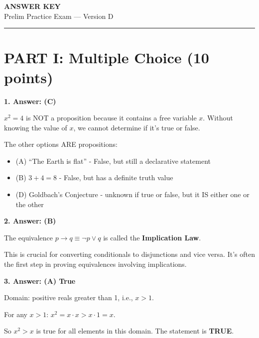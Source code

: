 \documentclass[11pt,a4paper]{article}
\begin{document}
\begin{center}
{\LARGE\textbf{ANSWER KEY}}\\[5pt]
{\Large Prelim Practice Exam --- Version D}\\[10pt]
\rule{0.8\textwidth}{0.5pt}
\end{center}

\vspace{15pt}

\section*{PART I: Multiple Choice (10 points)}

\textbf{1. Answer: (C)}

\begin{solnbox}
$x^2 = 4$ is NOT a proposition because it contains a free variable $x$. Without knowing the value of $x$, we cannot determine if it's true or false.

The other options ARE propositions:
\begin{itemize}[noitemsep]
    \item (A) ``The Earth is flat'' - False, but still a declarative statement
    \item (B) $3 + 4 = 8$ - False, but has a definite truth value
    \item (D) Goldbach's Conjecture - unknown if true or false, but it IS either one or the other
\end{itemize}
\end{solnbox}

\vspace{10pt}

\textbf{2. Answer: (B)}

\begin{solnbox}
The equivalence $p \to q \equiv \neg p \lor q$ is called the \textbf{Implication Law}.

This is crucial for converting conditionals to disjunctions and vice versa. It's often the first step in proving equivalences involving implications.
\end{solnbox}

\vspace{10pt}

\textbf{3. Answer: (A) True}

\begin{solnbox}
Domain: positive reals greater than 1, i.e., $x > 1$.

For any $x > 1$: $x^2 = x \cdot x > x \cdot 1 = x$.

So $x^2 > x$ is true for all elements in this domain. The statement is \textbf{TRUE}.
\end{solnbox}
\end{document}

